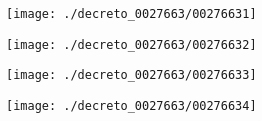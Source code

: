 \begin{figure}[!ht]
    \centering
    \texttt{[image: ./decreto\_0027663/00276631]}
\end{figure}
\clearpage

\begin{figure}[!ht]
    \centering
    \texttt{[image: ./decreto\_0027663/00276632]}
\end{figure}
\clearpage

\begin{figure}[!ht]
    \centering
    \texttt{[image: ./decreto\_0027663/00276633]}
\end{figure}
\clearpage

\begin{figure}[!ht]
    \centering
    \texttt{[image: ./decreto\_0027663/00276634]}
\end{figure}
\clearpage